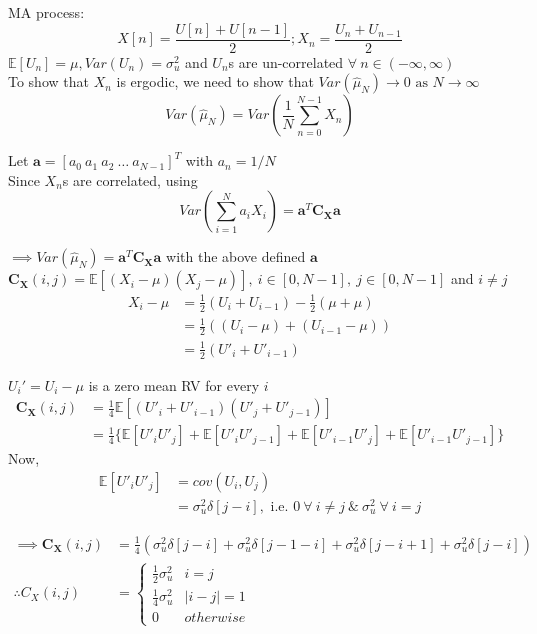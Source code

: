 \documentclass[12pt]{article}
\begin{document}
\noindent
MA process:
\[
X[n] = \frac{U[n] + U[n-1]}{2}; X_n = \frac{U_n + U_{n-1}}{2}
\]
$\mathbb{E}[U_n] = \mu, Var(U_n) = \sigma_{u}^2$ and $U_n$s are un-correlated $\forall \ n \in (-\infty, \infty)$\\[8pt]
\noindent
To show that $X_n$ is ergodic, we need to show that $Var(\hat{\mu}_N) \rightarrow 0 \text{ as } N \rightarrow \infty$\\[8pt]

\noindent
\[
Var(\hat{\mu}_N) = Var \left( \frac{1}{N} \sum_{n = 0}^{N-1} X_n \right)
\]

\noindent
Let $\mathbf{a} = [a_0 \ a_1 \ a_2 \ \dots \ a_{N-1}]^T$ with $a_n = 1/N$\\[8pt]
Since $X_n$s are correlated, using
\[
Var\left( \sum_{i=1}^{N} a_i X_i \right) = \mathbf{a}^T \mathbf{C_X} \mathbf{a}
\]

\noindent
$\implies Var(\hat{\mu}_N) = \mathbf{a}^T \mathbf{C_X} \mathbf{a}$ with the above defined $\mathbf{a}$ \\[8pt]
$\mathbf{C_X}(i, j) = \mathbb{E}[(X_i - \mu)(X_j - \mu)],\ i \in [0, N-1],\ j \in [0, N-1]$ and $i \neq j$
\begin{align*}
  X_i - \mu &= \frac{1}{2}(U_i + U_{i-1}) - \frac{1}{2}(\mu + \mu) \\[8pt]
  &= \frac{1}{2}((U_i - \mu) + (U_{i-1} - \mu)) \\[8pt]
  &= \frac{1}{2}(U'_i + U'_{i-1})
\end{align*}

\noindent
$U_{i}' = U_{i} - \mu$ is a zero mean RV for every $i$
\begin{align*}
  \mathbf{C_X}(i, j) &= \frac{1}{4} \mathbb{E}[(U'_i + U'_{i-1})(U'_j + U'_{j-1})]\\[8pt]
  &= \frac{1}{4} \{ \mathbb{E}[U'_i U'_j] + \mathbb{E}[U'_i U'_{j-1}] + \mathbb{E}[U'_{i-1} U'_j] + \mathbb{E}[U'_{i-1} U'_{j-1}] \}
\end{align*}
Now,
\begin{align*}
  \mathbb{E}[U'_i U'_j] &= cov(U_i, U_j) \\[8pt]
  &= \sigma_u^2 \delta[j-i], \text{ i.e. } 0 \ \forall \ i \neq j \ \& \ \sigma_u^2 \ \forall \ i=j
\end{align*}

\begin{align*}
  \implies \mathbf{C_X}(i, j) &= \frac{1}{4} ( \sigma_u^2 \delta[j-i] + \sigma_u^2 \delta[j-1-i] + \sigma_u^2 \delta[j-i+1] + \sigma_u^2 \delta[j-i] )\\[8pt]
  \therefore C_X(i, j) &= \begin{cases} \frac{1}{2} \sigma_u^2 & i = j \\[8pt] \frac{1}{4} \sigma_u^2 & |i-j| = 1 \\[8pt] 0 & otherwise \end{cases}
\end{align*}
\end{document}
